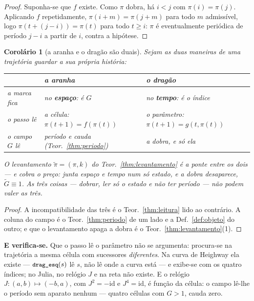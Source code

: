 \documentclass[11pt,a4paper]{article}
\newcommand{\code}[1]{\texttt{\small #1}}
\newtheorem{corolario}[teorema]{Corolário}
\begin{document}
\begin{proof}
Suponha-se que $f$ existe. Como $\pi$ dobra, há $i<j$ com $\pi(i)=\pi(j)$.
Aplicando $f$ repetidamente, $\pi(i+m)=\pi(j+m)$ para todo $m$ admissível, logo
$\pi(t+(j-i))=\pi(t)$ para todo $t\ge i$: $\pi$ é eventualmente periódica de
período $j-i$ a partir de $i$, contra a hipótese.
\end{proof}

\begin{corolario}[a aranha e o dragão são duais]\label{cor:duais}
Sejam as duas maneiras de uma trajetória guardar a sua própria história:
\begin{center}\small
\begin{tabular}{@{}lll@{}}
\toprule
 & \textbf{a aranha} & \textbf{o dragão} \\
\midrule
a marca fica & no \textbf{espaço}: é $G$ & no \textbf{tempo}: é o índice \\
o passo lê & a célula: $\pi(t{+}1)=f(\pi(t))$ & o parâmetro: $\pi(t{+}1)=g(t,\pi(t))$ \\
o campo $G$ lê & período e cauda (Teor.~\ref{thm:periodo}) & a dobra, e só ela \\
\bottomrule
\end{tabular}
\end{center}
O levantamento $\tilde\pi=(\pi,k)$ do Teor.~\ref{thm:levantamento} é a ponte
entre os dois --- e cobra o preço: junta espaço e tempo num só estado, e a
dobra desaparece, $\tilde G\equiv1$. As três coisas ---
\emph{dobrar}, \emph{ler só o estado} e \emph{não ter período} --- não podem
valer as três.
\end{corolario}

\begin{proof}
A incompatibilidade das três é o Teor.~\ref{thm:leitura} lido ao contrário. A
coluna do campo é o Teor.~\ref{thm:periodo} de um lado e a
Def.~\ref{def:objeto} do outro; e que o levantamento apaga a dobra é o
Teor.~\ref{thm:levantamento}(1).
\end{proof}

\medskip\noindent\textbf{E verifica-se.} Que o passo lê o parâmetro não se
argumenta: procura-se na trajetória a mesma célula com sucessores
\emph{diferentes}. Na curva de Heighway ela existe --- $\code{drag\_esq}(s)$ lê
$s$, não lê onde a curva está --- e exibe-se com os quatro índices; no Julia, no
relógio $J$ e na reta não existe. E o relógio $J\colon(a,b)\mapsto(-b,a)$, com
$J^2=-\mathrm{id}$ e $J^4=\mathrm{id}$, é função da célula: o campo lê-lhe o
período sem aparato nenhum --- quatro células com $G>1$, cauda zero.
\end{document}
